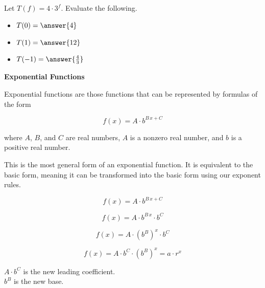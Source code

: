 \documentclass{ximera}
\begin{document}
\begin{example}

Let $T(f) = 4 \cdot 3^f$.  Evaluate the following.

\begin{itemize}
\item $T(0) = \answer{4}$ 
\item $T(1) = \answer{12}$
\item $T(-1) = \answer{\frac{4}{3}}$
\end{itemize}
\end{example}
















\begin{definition} \textbf{\textcolor{green!50!black}{Exponential Functions}}

Exponential functions are those functions that can be represented by formulas of the form


\[      f(x) = A \cdot b^{B \, x + C}   \]

where $A$, $B$, and $C$ are real numbers, $A$ is a nonzero real number, and $b$ is a positive real number.


\end{definition}



This is the most general form of an exponential function.  It is equivalent to the basic form, meaning it can be transformed into the basic form using our exponent rules.




\[
f(x) = A \cdot b^{B \, x + C} 
\]

\[
f(x) = A \cdot b^{B \, x} \cdot  b^C 
\]

\[
f(x) = A \cdot (b^{B})^x \cdot  b^C 
\]


\[
f(x) = A \cdot b^C \cdot (b^{B})^x = a \cdot r^x
\]





$A \cdot b^C$ is the new leading coefficient. \\

$b^{B}$ is the new base.
\end{document}
